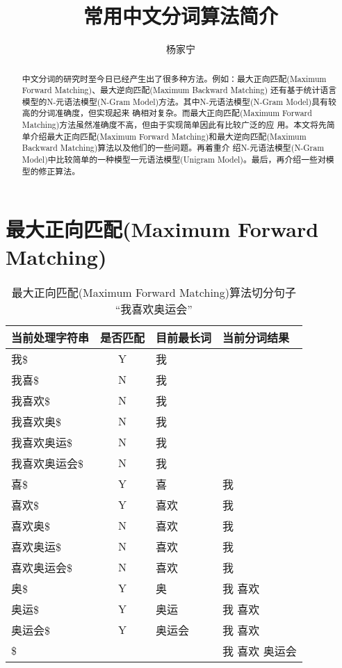 \documentclass[12pt,a4paper]{article}
\title{常用中文分词算法简介}
\author{杨家宁}
\def\maxforward{最大正向匹配(Maximum Forward Matching)}
\def\maxbackward{最大逆向匹配(Maximum Backward Matching)}
\def\NGram{N-元语法模型(N-Gram Model)}
\def\UniGram{一元语法模型(Unigram Model)}
\begin{document}
\maketitle

\def\abstractname{\bf 摘 要}
\begin{abstract}
中文分词的研究时至今日已经产生出了很多种方法。例如：\maxforward 、\maxbackward
还有基于统计语言模型的\NGram 方法。其中\NGram 具有较高的分词准确度，但实现起来
确相对复杂。而\maxforward 方法虽然准确度不高，但由于实现简单因此有比较广泛的应
用。本文将先简单介绍\maxforward 和\maxbackward 算法以及他们的一些问题。再着重介
绍\NGram 中比较简单的一种模型\UniGram 。最后，再介绍一些对模型的修正算法。
\end{abstract}

\section{\maxforward}
\begin{table}
\caption{\maxforward 算法切分句子 “我喜欢奥运会”}
\label{tbl_maxforward}
	\begin{center}
		\begin{tabular}{l|c|l|l}
			当前处理字符串 & 是否匹配    & 目前最长词 & 当前分词结果   \\
			\hline
			我\$           &  Y  & 我         &                \\
			我喜\$         &  N  & 我         &                \\
			我喜欢\$       &  N  & 我         &                \\
			我喜欢奥\$     &  N  & 我         &                \\
			我喜欢奥运\$   &  N  & 我         &                \\
			我喜欢奥运会\$ &  N  & 我         &                \\
			喜\$           &  Y  & 喜         & 我             \\ 
			喜欢\$         &  Y  & 喜欢       & 我             \\ 
			喜欢奥\$       &  N  & 喜欢       & 我             \\ 
			喜欢奥运\$     &  N  & 喜欢       & 我             \\ 
			喜欢奥运会\$   &  N  & 喜欢       & 我             \\ 
			奥\$           &  Y  & 奥         & 我 喜欢        \\ 
			奥运\$         &  Y  & 奥运       & 我 喜欢        \\ 
			奥运会\$       &  Y  & 奥运会     & 我 喜欢        \\ 
		    \$             &          &            & 我 喜欢 奥运会 \\
		\end{tabular}
	\end{center}
\end{table}
\end{document}
